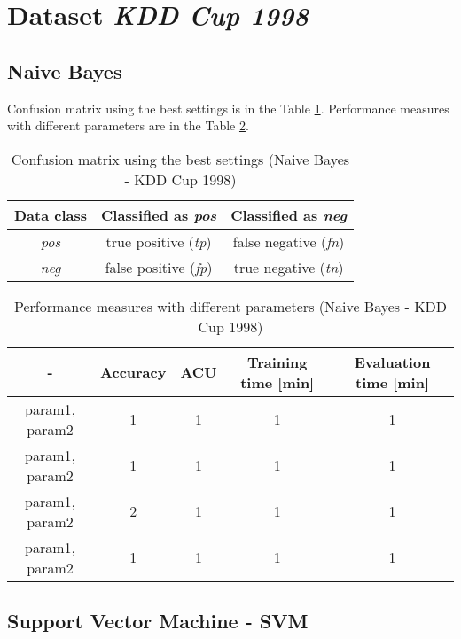 \documentclass[11pt,a4paper,titlepage]{article}
\begin{document}
\section{Dataset \textit{KDD Cup 1998}}

\subsection{Naive Bayes}
Confusion matrix using the best settings is in the Table \ref{table:confusionMatrixBayesKDD}. Performance measures with different parameters are in the Table \ref{table:BayesKDD}.
\begin{table}
  \centering
  \begin{tabular}{| c | c | c |}
    \hline
    Data class & Classified as \textit{pos} & Classified as \textit{neg} \\ \hline
    \textit{pos} & true positive (\textit{tp}) & false negative (\textit{fn}) \\ \hline
    \textit{neg} & false positive (\textit{fp}) & true negative (\textit{tn}) \\
    \hline
  \end{tabular}
  \caption{Confusion matrix using the best settings (Naive Bayes - KDD Cup 1998)}
  \label{table:confusionMatrixBayesKDD}
  \end{table}
  
  \begin{table}
  \centering
  \begin{tabular}{| c | c | c | c | c |}
    \hline
     		-	   & Accuracy & 	ACU 	& Training time [min] & Evaluation time [min] \\ \hline
    param1, param2 &  1 	  &     1		& 		1			  & 		1 		\\ \hline
    param1, param2 & 	1	  & 	1 		& 		1			  &			1 		\\ \hline
    param1, param2 & 	2	  & 	1		& 		1			  &			1		\\ \hline
    param1, param2 &  1       & 	1		& 		1			  &			1			\\
    \hline
  \end{tabular}
  \caption{Performance measures with different parameters (Naive Bayes - KDD Cup 1998)}
  \label{table:BayesKDD}
  \end{table}
  
\subsection{Support Vector Machine - SVM}
\end{document}

